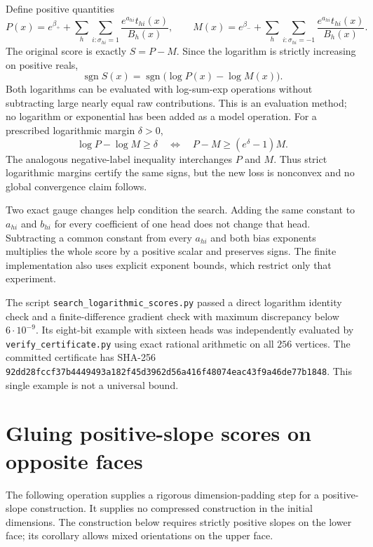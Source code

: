 \documentclass[11pt]{article}
\begin{document}
Define positive quantities
\[
 P(x)=e^{\beta_+}+\sum_h\sum_{i:\sigma_{hi}=1}
                   \frac{e^{a_{hi}}t_{hi}(x)}{B_h(x)},\qquad
 M(x)=e^{\beta_-}+\sum_h\sum_{i:\sigma_{hi}=-1}
                   \frac{e^{a_{hi}}t_{hi}(x)}{B_h(x)}.
\]
The original score is exactly $S=P-M$. Since the logarithm is strictly
increasing on positive reals,
\[
 \operatorname{sgn}S(x)
 =\operatorname{sgn}\bigl(\log P(x)-\log M(x)\bigr).
\]
Both logarithms can be evaluated with log-sum-exp operations without
subtracting large nearly equal raw contributions. This is an evaluation
method; no logarithm or exponential has been added as a model operation.
For a prescribed logarithmic margin $\delta>0$,
\[
 \log P-\log M\geq\delta
 \quad\Longleftrightarrow\quad
 P-M\geq(e^\delta-1)M.
\]
The analogous negative-label inequality interchanges $P$ and $M$.
Thus strict logarithmic margins certify the same signs, but the new
loss is nonconvex and no global convergence claim follows.

Two exact gauge changes help condition the search. Adding the same
constant to $a_{hi}$ and $b_{hi}$ for every coefficient of one head
does not change that head. Subtracting a common constant from every
$a_{hi}$ and both bias exponents multiplies the whole score by a
positive scalar and preserves signs. The finite implementation also
uses explicit exponent bounds, which restrict only that experiment.

The script \texttt{search\_logarithmic\_scores.py} passed a direct
logarithm identity check and a finite-difference gradient check with
maximum discrepancy below $6\cdot10^{-9}$. Its eight-bit example
with sixteen heads was independently evaluated by
\texttt{verify\_certificate.py} using exact rational arithmetic on
all $256$ vertices. The committed certificate has SHA-256
\texttt{92dd28fccf37b4449493a182f45d3962d56a416f48074eac43f9a46de77b1848}.
This single example is not a universal bound.

\section{Gluing positive-slope scores on opposite faces}

The following operation supplies a rigorous dimension-padding step for a
positive-slope construction. It supplies no compressed construction in the
initial dimensions. The construction below requires strictly positive
slopes on the lower face; its corollary allows mixed orientations on
the upper face.
\end{document}
